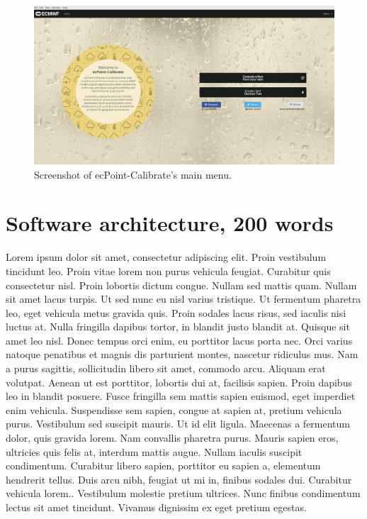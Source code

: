 \documentclass[techmemo]{ecmwfrep}%
\begin{document}
\begin{figure}
\includegraphics{Figures/Main_Menu.png}
\caption{Screenshot of ecPoint-Calibrate's main menu.}
\label{Main_Menu}
\end{figure}

\section{Software architecture, 200 words}
Lorem ipsum dolor sit amet, consectetur adipiscing elit. Proin vestibulum tincidunt leo. Proin vitae lorem non purus vehicula feugiat. Curabitur quis consectetur nisl. Proin lobortis dictum congue. Nullam sed mattis quam. Nullam sit amet lacus turpis. Ut sed nunc eu nisl varius tristique. Ut fermentum pharetra leo, eget vehicula metus gravida quis. Proin sodales lacus risus, sed iaculis nisi luctus at. Nulla fringilla dapibus tortor, in blandit justo blandit at. Quisque sit amet leo nisl. Donec tempus orci enim, eu porttitor lacus porta nec. Orci varius natoque penatibus et magnis dis parturient montes, nascetur ridiculus mus. Nam a purus sagittis, sollicitudin libero sit amet, commodo arcu. Aliquam erat volutpat. Aenean ut est porttitor, lobortis dui at, facilisis sapien. Proin dapibus leo in blandit posuere. Fusce fringilla sem mattis sapien euismod, eget imperdiet enim vehicula. Suspendisse sem sapien, congue at sapien at, pretium vehicula purus. Vestibulum sed suscipit mauris. Ut id elit ligula. Maecenas a fermentum dolor, quis gravida lorem. Nam convallis pharetra purus. Mauris sapien eros, ultricies quis felis at, interdum mattis augue. Nullam iaculis suscipit condimentum. Curabitur libero sapien, porttitor eu sapien a, elementum hendrerit tellus. Duis arcu nibh, feugiat ut mi in, finibus sodales dui. Curabitur vehicula lorem.. Vestibulum molestie pretium ultrices. Nunc finibus condimentum lectus sit amet tincidunt. Vivamus dignissim ex eget pretium egestas.
\end{document}
